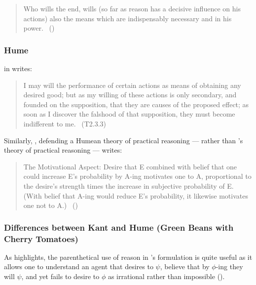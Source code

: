 \documentclass[10pt]{article}
\newcommand{\hozline}[0]{%
  \noindent\hdashrule[0.5ex][c]{\textwidth}{.1pt}{}
}
\newcommand{\hozlinedash}[0]{%
  \noindent\hdashrule[0.5ex][c]{\textwidth}{.1pt}{2.5pt}
}
\begin{document}
\begin{quote}
  Who wills the end, wills (so far as reason has a decisive influence on his actions) also the means which are indispensably necessary and in his power.\nolinebreak
  \mbox{ }\hfill\mbox{(\citeyear[80--81/Ak 417]{Kant:1948aa})}
\end{quote}


\hozline

\subsubsection*{Hume}
\label{sec:hume}

\citeauthor{Hume:2011aa} in  writes:

\begin{quote}
  I may will the performance of certain actions as means of obtaining any desired good; but as my willing of these actions is only secondary, and founded on the supposition, that they are causes of the proposed effect; as soon as I discover the falshood of that supposition, they must become indifferent to me.\nolinebreak
  \mbox{ }\hfill\mbox{\hfill(T2.3.3)}
\end{quote}

\hozlinedash

Similarly, \citeauthor{Sinhababu:2017aa}, defending a Humean theory of practical reasoning --- rather than \citeauthor{Hume:2011aa}'s theory of practical reasoning --- writes:

\begin{quote}
  The Motivational Aspect:
  Desire that E combined with belief that one could increase E's probability by A-ing motivates one to A, proportional to the desire's strength times the increase in subjective probability of E.
  (With belief that A-ing would reduce E's probability, it likewise motivates one not to A.)\nolinebreak
  \mbox{ }\hfill\mbox{(\citeyear[23]{Sinhababu:2017aa})}
\end{quote}

\hozline

\subsubsection*{Differences between Kant and Hume \hfill (Green Beans with Cherry Tomatoes)}
\label{sec:role-reason}



As \citeauthor{Dreier:2001aa} highlights, the parenthetical use of reason in \citeauthor{Kant:1948aa}'s formulation is quite useful as it allows one to understand an agent that desires to \(\psi\), believe that by \(\phi\)-ing they will \(\psi\), and yet fails to desire to \(\phi\) as irrational rather than impossible (\citeyear[35]{Dreier:2001aa}).
\end{document}

